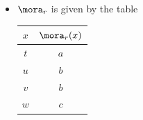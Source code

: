 {\begin{gradedexercise}
\begin{enumerate}
\begin{itemize}
\begin{center}
\begin{tabular}{c|c}
                                $5$ & $a$ \\
                                $6$ & $c$
                            \end{tabular}
                        \end{center}
                  \item $\mora_r$ is given by the table
                        \begin{center}
                            \begin{tabular}{c|c}
                                $x$ & $\mora_r(x)$ \\
                                \hline
                                $t$ & $a$ \\
                                $u$ & $b$ \\
                                $v$ & $b$ \\
                                $w$ & $c$
                            \end{tabular}
                        \end{center}
              \end{itemize}
    \end{enumerate}

\end{gradedexercise}


}
